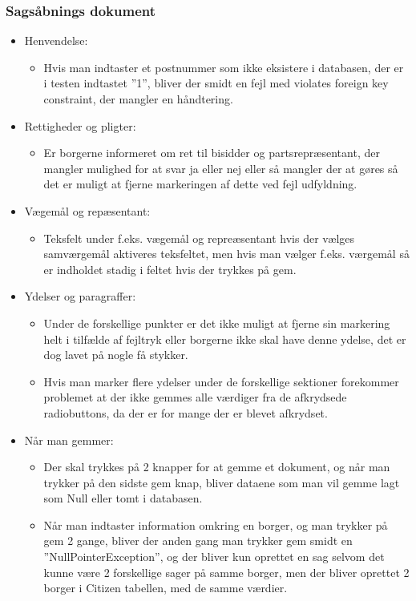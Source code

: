\subsubsection{Sagsåbnings dokument}
\begin{itemize}
\item Henvendelse:
\begin{itemize}
\item Hvis man indtaster et postnummer som ikke eksistere i databasen, der er i testen indtastet ”1”, bliver der smidt en fejl med violates foreign key constraint, der mangler en håndtering.
\end{itemize}
\item Rettigheder og pligter:
\begin{itemize}
\item Er borgerne informeret om ret til bisidder og partsrepræsentant, der mangler mulighed for at svar ja eller nej eller så mangler der at gøres så det er muligt at fjerne markeringen af dette ved fejl udfyldning.
\end{itemize}
\item Vægemål og repæsentant:
\begin{itemize}
\item Teksfelt under f.eks. vægemål og repreæsentant hvis der vælges samværgemål aktiveres teksfeltet, men hvis man vælger f.eks. værgemål så er indholdet stadig i feltet hvis der trykkes på gem. 
\end{itemize}
\item Ydelser og paragraffer:
\begin{itemize}
\item Under de forskellige punkter er det ikke muligt at fjerne sin markering helt i tilfælde af fejltryk eller borgerne ikke skal have denne ydelse, det er dog lavet på nogle få stykker.
\item Hvis man marker flere ydelser under de forskellige sektioner forekommer problemet at der ikke gemmes alle værdiger fra de afkrydsede radiobuttons, da der er for mange der er blevet afkrydset. 
\end{itemize}
\item Når man gemmer:
\begin{itemize}
\item Der skal trykkes på 2 knapper for at gemme et dokument, og når man trykker på den sidste gem knap, bliver dataene som man vil gemme lagt som Null eller tomt i databasen.
\item Når man indtaster information omkring en borger, og man trykker på gem 2 gange, bliver der anden gang man trykker gem smidt en ”NullPointerException”, og der bliver kun oprettet en sag selvom det kunne være 2 forskellige sager på samme borger, men der bliver oprettet 2 borger i Citizen tabellen, med de samme værdier.
\end{itemize}
\end{itemize}
